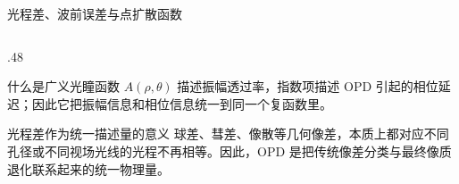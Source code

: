 \begin{frame}{光程差、波前误差与点扩散函数}
\begin{columns}[T]
\begin{column}{.48\textwidth}
            \begin{block}{什么是广义光瞳函数}
                $A(\rho,\theta)$ 描述振幅透过率，指数项描述 OPD 引起的相位延迟；因此它把\alert{振幅信息和相位信息}统一到同一个复函数里。
            \end{block}

            \begin{alertblock}{光程差作为统一描述量的意义}
                球差、彗差、像散等几何像差，本质上都对应不同孔径或不同视场光线的\alert{光程不再相等}。因此，OPD 是把传统像差分类与最终像质退化联系起来的统一物理量。
            \end{alertblock}

        \end{column}
    \end{columns}
\end{frame}

